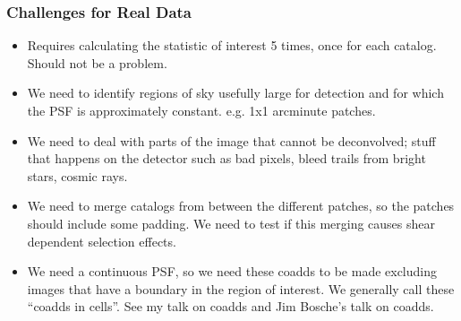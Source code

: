 \documentclass{beamer}
\begin{document}
\frame
{
    \frametitle{Challenges for Real Data}

 
    \begin{itemize}

        \item Requires calculating the statistic of interest 5 times, once for
            each catalog. Should not be a problem.

        \item We need to identify regions of sky usefully large for
            detection and for which the PSF is approximately constant.
            e.g. 1x1 arcminute patches.

        \item We need to deal with parts of the image that cannot be
            deconvolved; stuff that happens on the detector such as bad pixels,
            bleed trails from bright stars, cosmic rays.

        \item We need to merge catalogs from between the different patches, so
            the patches should include some padding.  We need to test if this
            merging causes shear dependent selection effects.

        \item We need a continuous PSF, so we need these coadds to be made
            excluding images that have a boundary in the region of interest.
            We generally call these ``coadds in cells''.
            See my talk on coadds and Jim  Bosche's talk on coadds.

    \end{itemize}

}



 


\end{document}
